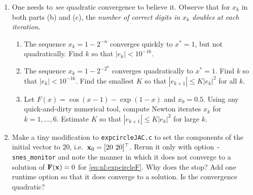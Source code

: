 \renewcommand{\labelenumi}{\arabic{chapter}.\arabic{enumi}\quad}
\renewcommand{\labelenumii}{(\alph{enumii})}
\begin{enumerate}
\item One needs to \emph{see} quadratic convergence to believe it.  Observe that for $x_k$ in both parts (b) and (c), the \emph{number of correct digits in $x_k$ doubles at each iteration}. \begin{enumerate}
    \item The sequence $x_k = 1-2^{-n}$ converges quickly to $x^*=1$, but not quadratically.  Find $k$ so that $|e_k| < 10^{-16}$.
    \item The sequence $x_k = 1-2^{-2^n}$ converges quadratically to $x^*=1$.  Find $k$ so that $|e_k| < 10^{-16}$.  Find the smallest $K$ so that $|e_{k+1}| \le K |e_k|^2$ for all $k$.
    \item Let $F(x) = \cos(x-1) - \exp(1-x)$ and $x_0=0.5$.  Using any quick-and-dirty numerical tool, compute Newton iterates $x_k$ for $k=1,\dots,6$.  Estimate $K$ so that $|e_{k+1}| \le K |e_k|^2$ for large $k$.
    \end{enumerate}

\item Make a tiny modification to \texttt{expcircleJAC.c} to set the components of the initial vector to $20$, i.e.~$\mathbf{x}_0 = [20\,\, 20]^\top$.  Rerun it only with option \texttt{-snes\_monitor} and note the manner in which it does not converge to a solution of $\mathbf{F}(\mathbf{x})=0$ for \eqref{eq:nl:expcircleF}.  Why does the \pSNES stop?  Add one runtime option so that it does converge to a solution.  Is the convergence quadratic?
\end{enumerate}